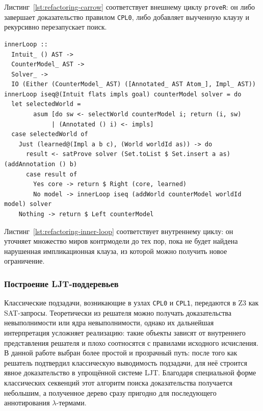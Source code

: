 \documentclass[14pt, russian]{scrartcl}
\begin{document}
Листинг~\ref{lst:refactoring-carrow} соответствует внешнему циклу
\texttt{proveR}: он либо завершает доказательство правилом \texttt{CPL0}, либо
добавляет выученную клаузу и рекурсивно перезапускает поиск.

\begin{listing}[!htb]
\caption{Внутренний цикл построения контрмодели}
\label{lst:refactoring-inner-loop}
\begin{verbatim}
innerLoop ::
  Intuit_ () AST ->
  CounterModel_ AST ->
  Solver_ ->
  IO (Either (CounterModel_ AST) ([Annotated_ AST Atom_], Impl_ AST))
innerLoop iseq@(Intuit flats impls goal) counterModel solver = do
  let selectedWorld =
        asum [do sw <- selectWorld counterModel i; return (i, sw)
             | (Annotated () i) <- impls]
  case selectedWorld of
    Just (learned@(Impl a b c), (World worldId as)) -> do
      result <- satProve solver (Set.toList $ Set.insert a as) (addAnnotation () b)
      case result of
        Yes core -> return $ Right (core, learned)
        No model -> innerLoop iseq (addWorld counterModel worldId model) solver
    Nothing -> return $ Left counterModel
\end{verbatim}
\end{listing}

Листинг~\ref{lst:refactoring-inner-loop} соответствует внутреннему циклу:
он уточняет множество миров контрмодели до тех пор, пока не будет найдена
нарушенная импликационная клауза, из которой можно получить новое ограничение.

\subsubsection{Построение LJT-поддеревьев}

Классические подзадачи, возникающие в узлах \texttt{CPL0} и \texttt{CPL1},
передаются в Z3 как SAT-запросы. Теоретически из решателя можно получать
доказательства невыполнимости или ядра невыполнимости, однако их дальнейшая
интерпретация усложняет реализацию: такие объекты зависят от внутреннего
представления решателя и плохо соотносятся с правилами исходного исчисления. В
данной работе выбран более простой и прозрачный путь: после того как решатель
подтвердил классическую выводимость подзадачи, для неё строится явное
доказательство в упрощённой системе LJT. Благодаря специальной форме классических
секвенций этот алгоритм поиска доказательства получается небольшим, а полученное
дерево сразу пригодно для последующего аннотирования $\lambda$-термами.
\end{document}
